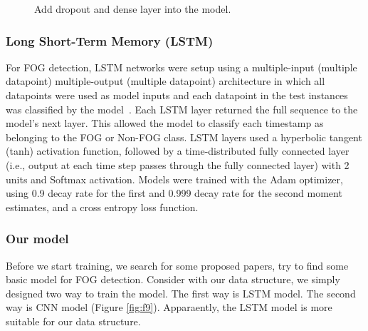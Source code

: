 \documentclass[10pt,twocolumn,letterpaper]{article}
\begin{document}
\begin{figure}[t]
    \centering
    \caption{Add dropout and dense layer into the model.}
    \label{fig:f11}
\end{figure}

\subsubsection{Long Short-Term Memory (LSTM)}
\label{sec:lstm}

    For FOG detection, LSTM networks were setup using a multiple-input (multiple datapoint) multiple-output (multiple datapoint) architecture in which all datapoints were used as model inputs and each datapoint in the test instances was classified by the model~\cite{Shalin2021}. Each LSTM layer returned the full sequence to the model’s next layer. This allowed the model to classify each timestamp as belonging to the FOG or Non-FOG class. LSTM layers used a hyperbolic tangent (tanh) activation function, followed by a time-distributed fully connected layer (i.e., output at each time step passes through the fully connected layer) with 2 units and Softmax activation. Models were trained with the Adam optimizer, using 0.9 decay rate for the first and 0.999 decay rate for the second moment estimates, and a cross entropy loss function.

\subsubsection{Our model}
\label{sec:our_model}

    Before we start training, we search for some proposed papers, try to find some basic model for FOG detection. Consider with our data structure, we simply designed two way to train the model. The first way is LSTM model. The second way is CNN model (Figure \ref{fig:f9}). Apparaently, the LSTM model is more suitable for our data structure.
\end{document}
